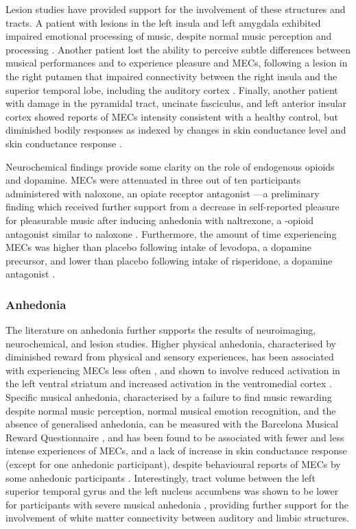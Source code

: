 Lesion studies have provided support for the involvement of these structures and tracts. A patient with lesions in the left insula and left amygdala exhibited impaired emotional processing of music, despite normal music perception and processing \parencite{griffiths2004}. Another patient lost the ability to perceive subtle differences between musical performances and to experience pleasure and MECs, following a lesion in the right putamen that impaired connectivity between the right insula and the superior temporal lobe, including the auditory cortex \parencite{satoh2016}. Finally, another patient with damage in the pyramidal tract, uncinate fasciculus, and left anterior insular cortex showed reports of MECs intensity consistent with a healthy control, but diminished bodily responses as indexed by changes in skin conductance level and skin conductance response \parencite{grunkina2017}.

Neurochemical findings provide some clarity on the role of endogenous opioids and dopamine. MECs were attenuated in three out of ten participants administered with naloxone, an opiate receptor antagonist \parencite{goldstein1980}---a preliminary finding which received further support from a decrease in self-reported pleasure for pleasurable music after inducing anhedonia with naltrexone, a {\textmu}-opioid antagonist similar to naloxone \parencite{mallik2017}. Furthermore, the amount of time experiencing MECs was higher than placebo following intake of levodopa, a dopamine precursor, and lower than placebo following intake of risperidone, a dopamine antagonist \parencite{ferreri2019}.



\subsubsection{Anhedonia}

The literature on anhedonia further supports the results of neuroimaging, neurochemical, and lesion studies. Higher physical anhedonia, characterised by diminished reward from physical and sensory experiences, has been associated with experiencing MECs less often \parencite{nusbaum2015}, and shown to involve reduced activation in the left ventral striatum and increased activation in the ventromedial cortex \parencites{dowd2012, harvey2007}[as cited by][]{nusbaum2015}. Specific musical anhedonia, characterised by a failure to find music rewarding despite normal music perception, normal musical emotion recognition, and the absence of generalised anhedonia, can be measured with the Barcelona Musical Reward Questionnaire \parencite{masherrero2013}, and has been found to be associated with fewer and less intense experiences of MECs, and a lack of increase in skin conductance response (except for one anhedonic participant), despite behavioural reports of MECs by some anhedonic participants \parencite{masherrero2014}. Interestingly, tract volume between the left superior temporal gyrus and the left nucleus accumbens was shown to be lower for participants with severe musical anhedonia \parencite{loui2017}, providing further support for the involvement of white matter connectivity between auditory and limbic structures.

